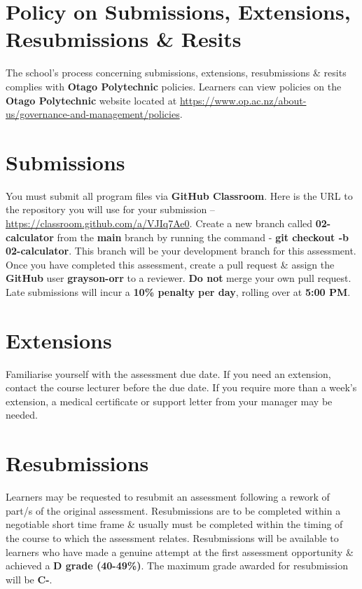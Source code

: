 \documentclass{article}
\begin{document}
\section*{Policy on Submissions, Extensions, Resubmissions \& Resits}
The school's process concerning submissions, extensions, resubmissions \& resits complies with \textbf{Otago Polytechnic} policies. Learners can view policies on the \textbf{Otago Polytechnic} website located at \href{https://www.op.ac.nz/about-us/governance-and-management/policies}{https://www.op.ac.nz/about-us/governance-and-management/policies}.

\section*{Submissions}
You must submit all program files via \textbf{GitHub Classroom}. Here is the URL to the repository you will use for your submission – \href{https://classroom.github.com/a/VJIq7Ae0}{https://classroom.github.com/a/VJIq7Ae0}. Create a new branch called  \textbf{02-calculator} from the \textbf{main} branch by running the command - \textbf{git checkout -b 02-calculator}. This branch will be your development branch for this assessment. Once you have completed this assessment, create a pull request \& assign the \textbf{GitHub} user \textbf{grayson-orr} to a reviewer. \textbf{Do not} merge your own pull request. Late submissions will incur a \textbf{10\% penalty per day}, rolling over at \textbf{5:00 PM}.

\section*{Extensions}
Familiarise yourself with the assessment due date. If you need an extension, contact the course lecturer before the due date. If you require more than a week's extension, a medical certificate or support letter from your manager may be needed.

\section*{Resubmissions}
Learners may be requested to resubmit an assessment following a rework of part/s of the original assessment. Resubmissions are to be completed within a negotiable short time frame \& usually must be completed within the timing of the course to which the assessment relates. Resubmissions will be available to learners who have made a genuine attempt at the first assessment opportunity \& achieved a \textbf{D grade (40-49\%)}. The maximum grade awarded for resubmission will be \textbf{C-}.
\end{document}
